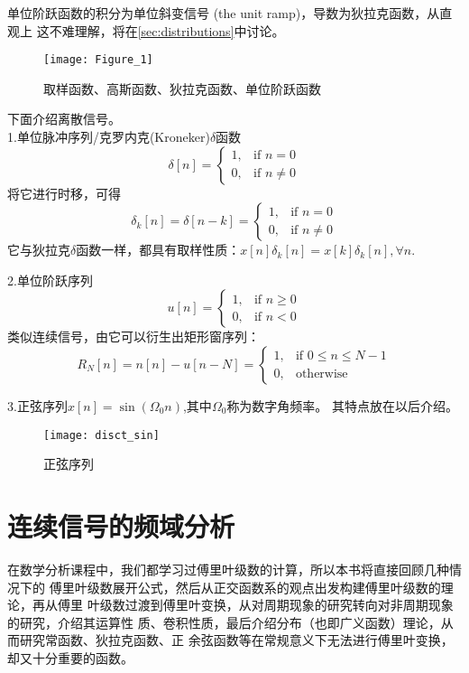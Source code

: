 \documentclass{ctexbook}
\begin{document}
单位阶跃函数的积分为单位斜变信号 (the unit ramp)，导数为狄拉克函数，从直观上
这不难理解，将在\ref{sec:distributions}中讨论。
\begin{figure}[htbp]
    \centering
    \texttt{[image: Figure\_1]}
    \caption{取样函数、高斯函数、狄拉克函数、单位阶跃函数}
\end{figure}

下面介绍离散信号。\\
1.单位脉冲序列/克罗内克(Kroneker)$\delta$函数
\[\delta[n]=\begin{cases}
        1, & \text{if }n=0     \\
        0, & \text{if }n\neq 0
    \end{cases}\]
将它进行时移，可得\[\delta_k[n]=\delta[n-k]=\begin{cases}
        1, & \text{if }n=0     \\
        0, & \text{if }n\neq 0
    \end{cases}\]
它与狄拉克$\delta$函数一样，都具有取样性质：$x[n]\delta_k[n]=x[k]\delta_k[n],\forall n$.

\noindent 2.单位阶跃序列\[u[n]=\begin{cases}
        1, & \text{if }n\geq 0 \\
        0, & \text{if }n< 0
    \end{cases}\]
类似连续信号，由它可以衍生出矩形窗序列：
\[R_N[n]=n[n]-u[n-N]=\begin{cases}
        1, & \text{if }0\leq n\leq N-1 \\
        0, & \text{otherwise}
    \end{cases}\]

\noindent 3.正弦序列$x[n]=\sin(\Omega_0n)$,其中$\Omega_0$称为数字角频率。
其特点放在以后介绍。
\begin{figure}[htbp]
    \centering
    \texttt{[image: disct\_sin]}
    \caption{正弦序列}
\end{figure}

\chapter{连续信号的频域分析}%
在数学分析课程中，我们都学习过傅里叶级数的计算，所以本书将直接回顾几种情况下的
傅里叶级数展开公式，然后从正交函数系的观点出发构建傅里叶级数的理论，再从傅里
叶级数过渡到傅里叶变换，从对周期现象的研究转向对非周期现象的研究，介绍其运算性
质、卷积性质，最后介绍分布（也即广义函数）理论，从而研究常函数、狄拉克函数、正
余弦函数等在常规意义下无法进行傅里叶变换，却又十分重要的函数。
\end{document}
